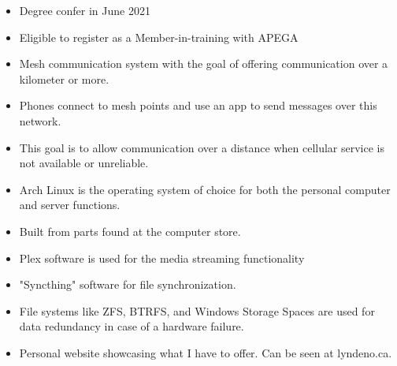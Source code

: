 
\begin{itemize}
    \item Degree confer in June 2021
    \item Eligible to register as a Member-in-training with APEGA
\end{itemize}







\begin{itemize}
\item Mesh communication system with the goal of offering communication over a kilometer or more. 
\item Phones connect to mesh points and use an app to send messages over this network.
\item This goal is to allow communication over a distance when cellular service is not available or unreliable.
\end{itemize}
\begin{itemize}
\item Arch Linux is the operating system of choice for both the personal computer and server functions.
\item Built from parts found at the computer store.
\item Plex software is used for the media streaming functionality
\item "Syncthing" software for file synchronization.
\item File systems like ZFS, BTRFS, and Windows Storage Spaces are used for data redundancy in case of a hardware failure.
\end{itemize}
\begin{itemize}
\item Personal website showcasing what I have to offer. Can be seen at lyndeno.ca.
\end{itemize}

